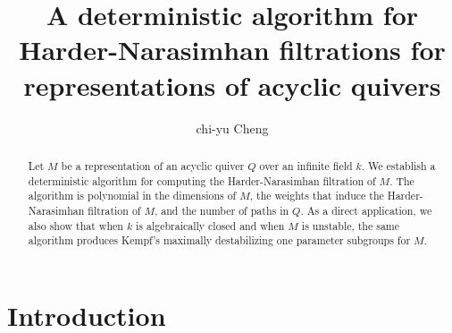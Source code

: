 \documentclass[a4paper]{amsart}
\title[]{A deterministic algorithm for Harder-Narasimhan filtrations for representations of acyclic quivers}
\author{chi-yu Cheng}
\date{}
\numberwithin{equation}{section}
\theoremstyle{plain}
\theoremstyle{definition}
\begin{document}
\begin{abstract}
    Let $M$ be a representation of an acyclic quiver $Q$ over an infinite field $k$. We establish a deterministic algorithm for computing the Harder-Narasimhan filtration of $M$. The algorithm is polynomial in the dimensions of $M$, the weights that induce the Harder-Narasimhan filtration of $M$, and the number of paths in $Q$. As a direct application, we also show that when $k$ is algebraically closed and when $M$ is unstable, the same algorithm produces Kempf's maximally destabilizing one parameter subgroups for $M$.
\end{abstract}
\maketitle
\tableofcontents
\section{Introduction}

\end{document}
